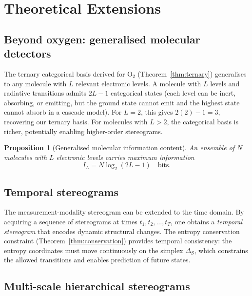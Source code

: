 \documentclass[11pt,twocolumn,a4paper]{article}
\newtheorem{proposition}[theorem]{Proposition}
\begin{document}
\section{Theoretical Extensions}\label{sec:extensions}

\subsection{Beyond oxygen: generalised molecular detectors}

The ternary categorical basis derived for O$_2$ (Theorem~\ref{thm:ternary}) generalises to any molecule with $L$ relevant electronic levels.
A molecule with $L$ levels and radiative transitions admits $2L - 1$ categorical states (each level can be inert, absorbing, or emitting, but the ground state cannot emit and the highest state cannot absorb in a cascade model).
For $L = 2$, this gives $2(2)-1 = 3$, recovering our ternary basis.
For molecules with $L > 2$, the categorical basis is richer, potentially enabling higher-order stereograms.

\begin{proposition}[Generalised molecular information content]\label{prop:general_info}
An ensemble of $N$ molecules with $L$ electronic levels carries maximum information
\begin{equation}\label{eq:general_info}
I_L = N \log_2(2L-1) \quad \text{bits}.
\end{equation}
\end{proposition}

\subsection{Temporal stereograms}

The measurement-modality stereogram can be extended to the time domain.
By acquiring a sequence of stereograms at times $t_1, t_2, \ldots, t_T$, one obtains a \emph{temporal stereogram} that encodes dynamic structural changes.
The entropy conservation constraint (Theorem~\ref{thm:conservation}) provides temporal consistency: the entropy coordinates must move continuously on the simplex $\Delta_S$, which constrains the allowed transitions and enables prediction of future states.

\subsection{Multi-scale hierarchical stereograms}
\end{document}
